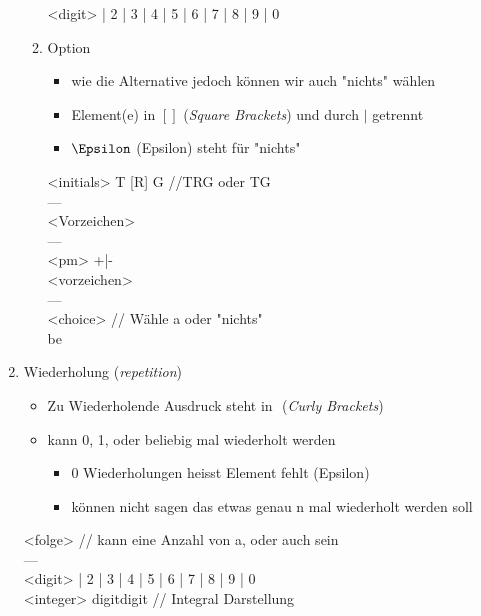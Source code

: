\documentclass[11pt]{article}
\begin{document}
\begin{enumerate}
\begin{enumerate}
<digit>  | 2 | 3 | 4 | 5 | 6 | 7 | 8 | 9 | 0

\item Option
\label{sec:org805dda4}
\begin{itemize}
\item wie die Alternative jedoch können wir auch "nichts" wählen\\
\item Element(e) in \([]\) (\emph{Square Brackets}) und durch \(|\) getrennt\\
\item \(\Epsilon\) (Epsilon) steht für "nichts"\\
\end{itemize}

<initials> \Leftarrow T [R] G  //TRG oder TG\\
---\\
<Vorzeichen> \Leftarrow [+|-]\\
---\\
<pm> \Leftarrow +|-\\
<vorzeichen> \Leftarrow [pm]\\
---\\
<choice> \Leftarrow [a|\Epsilon] // Wähle a oder "nichts"\\be
\end{enumerate}

\item Wiederholung (\emph{repetition})
\label{sec:org89d57dd}
\begin{itemize}
\item Zu Wiederholende Ausdruck steht in \({}\) (\emph{Curly Brackets})\\
\item kann 0, 1, oder beliebig mal wiederholt werden\\
\begin{itemize}
\item 0 Wiederholungen heisst Element fehlt (Epsilon)\\
\item können nicht sagen das etwas genau n mal wiederholt werden soll\\
\end{itemize}
\end{itemize}

<folge>  // kann eine Anzahl von a, oder auch \Epsilon sein\\
--- \\
<digit>  | 2 | 3 | 4 | 5 | 6 | 7 | 8 | 9 | 0\\
<integer> \Leftarrow [+|-] digit{digit} // Integral Darstellung\\


\end{enumerate}
\end{document}
